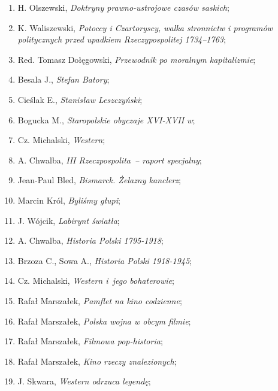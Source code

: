 \documentclass[a4paper,11pt]{article}
\begin{document}
\begin{enumerate}
\item H. Olszewski, \textit{Doktryny prawno-ustrojowe czasów saskich};
\item K. Waliszewski, \textit{Potoccy i Czartoryscy, walka stronnictw i
    programów politycznych przed upadkiem Rzeczypospolitej 1734--1763};

\item Red. Tomasz Dołęgowski, \textit{Przewodnik po moralnym
    kapitalizmie};

\item Besala J., \textit{Stefan Batory};

\item Cieślak E., \textit{Stanisław Leszczyński};

\item Bogucka M., \textit{Staropolskie obyczaje XVI-XVII w};

\item Cz. Michalski, \textit{Western};

\item A. Chwalba, \textit{III Rzeczpospolita~-- raport specjalny};

\item Jean-Paul Bled, \textit{Bismarck. Żelazny kanclerz};

\item Marcin Król, \textit{Byliśmy głupi};

\item J. Wójcik, \textit{Labirynt światła};

\item A. Chwalba, \textit{Historia Polski 1795-1918};

\item Brzoza C., Sowa A., \textit{Historia Polski 1918-1945};

\item Cz. Michalski, \textit{Western i~jego bohaterowie};

\item Rafał Marszałek, \textit{Pamflet na kino codzienne};

\item Rafał Marszałek, \textit{Polska wojna w obcym filmie};

\item Rafał Marszałek, \textit{Filmowa pop-historia};

\item Rafał Marszałek, \textit{Kino rzeczy znalezionych};

\item J. Skwara, \textit{Western odrzuca legendę};


\end{enumerate}
\end{document}
